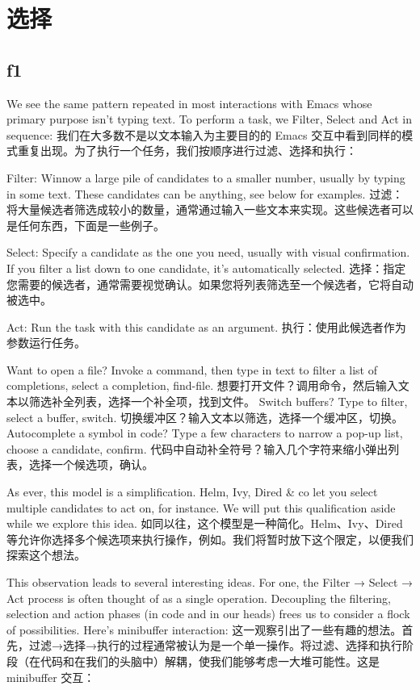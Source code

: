 \documentclass[lang=cn,color=blue]{elegantbook}
\begin{document}
\chapter{选择}
\label{sec:orgf4a5876}
\section{f1}
\label{sec:org7e88c21}
We see the same pattern repeated in most interactions with Emacs whose primary purpose isn’t typing text. To perform a task, we Filter, Select and Act in sequence:
我们在大多数不是以文本输入为主要目的的 Emacs 交互中看到同样的模式重复出现。为了执行一个任务，我们按顺序进行过滤、选择和执行：

Filter: Winnow a large pile of candidates to a smaller number, usually by typing in some text. These candidates can be anything, see below for examples.
过滤：将大量候选者筛选成较小的数量，通常通过输入一些文本来实现。这些候选者可以是任何东西，下面是一些例子。

Select: Specify a candidate as the one you need, usually with visual confirmation. If you filter a list down to one candidate, it’s automatically selected.
选择：指定您需要的候选者，通常需要视觉确认。如果您将列表筛选至一个候选者，它将自动被选中。

Act: Run the task with this candidate as an argument.
执行：使用此候选者作为参数运行任务。

Want to open a file? Invoke a command, then type in text to filter a list of completions, select a completion, find-file.
想要打开文件？调用命令，然后输入文本以筛选补全列表，选择一个补全项，找到文件。
Switch buffers? Type to filter, select a buffer, switch.
切换缓冲区？输入文本以筛选，选择一个缓冲区，切换。
Autocomplete a symbol in code? Type a few characters to narrow a pop-up list, choose a candidate, confirm.
代码中自动补全符号？输入几个字符来缩小弹出列表，选择一个候选项，确认。

As ever, this model is a simplification. Helm, Ivy, Dired \& co let you select multiple candidates to act on, for instance. We will put this qualification aside while we explore this idea.
如同以往，这个模型是一种简化。Helm、Ivy、Dired 等允许你选择多个候选项来执行操作，例如。我们将暂时放下这个限定，以便我们探索这个想法。

This observation leads to several interesting ideas. For one, the Filter → Select → Act process is often thought of as a single operation. Decoupling the filtering, selection and action phases (in code and in our heads) frees us to consider a flock of possibilities. Here’s minibuffer interaction:
这一观察引出了一些有趣的想法。首先，过滤→选择→执行的过程通常被认为是一个单一操作。将过滤、选择和执行阶段（在代码和在我们的头脑中）解耦，使我们能够考虑一大堆可能性。这是 minibuffer 交互：
\end{document}
